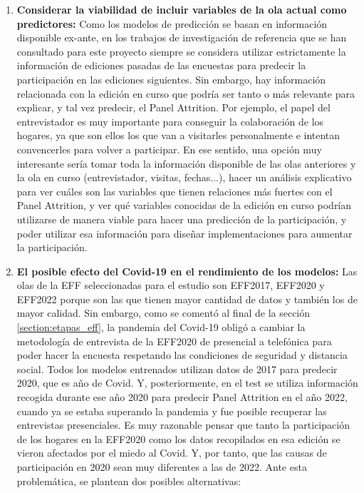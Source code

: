 \begin{enumerate}
    \item \textbf{Considerar la viabilidad de incluir variables de la ola actual como predictores:} Como los modelos de predicción se basan en información disponible ex-ante, en los trabajos de investigación de referencia que se han consultado para este proyecto siempre se considera utilizar estrictamente la información de ediciones pasadas de las encuestas para predecir la participación en las ediciones siguientes. Sin embargo, hay información relacionada con la edición en curso que podría ser tanto o más relevante para explicar, y tal vez predecir, el Panel Attrition. Por ejemplo, el papel del entrevistador es muy importante para conseguir la colaboración de los hogares, ya que son ellos los que van a visitarles personalmente e intentan convencerles para volver a participar. En ese sentido, una opción muy interesante sería tomar toda la información disponible de las olas anteriores y la ola en curso (entrevistador, visitas, fechas...), hacer un análisis explicativo para ver cuáles son las variables que tienen relaciones más fuertes con el Panel Attrition, y ver qué variables conocidas de la edición en curso podrían utilizarse de manera viable para hacer una predicción de la participación, y poder utilizar esa información para diseñar implementaciones para aumentar la participación.
    \item \textbf{El posible efecto del Covid-19 en el rendimiento de los modelos:} Las olas de la EFF seleccionadas para el estudio son EFF2017, EFF2020 y EFF2022 porque son las que tienen mayor cantidad de datos y también los de mayor calidad. Sin embargo, como se comentó al final de la sección \ref{section:etapas_eff}, la pandemia del Covid-19 obligó a cambiar la metodología de entrevista de la EFF2020 de presencial a telefónica para poder hacer la encuesta respetando las condiciones de seguridad y distancia social. Todos los modelos entrenados utilizan datos de 2017 para predecir 2020, que es año de Covid. Y, posteriormente, en el test se utiliza información recogida durante ese año 2020 para predecir Panel Attrition en el año 2022, cuando ya se estaba superando la pandemia y fue posible recuperar las entrevistas presenciales. Es muy razonable pensar que tanto la participación de los hogares en la EFF2020 como los datos recopilados en esa edición se vieron afectados por el miedo al Covid. Y, por tanto, que las causas de participación en 2020 sean muy diferentes a las de 2022. Ante esta problemática, se plantean dos posibles alternativas:
    \begin{enumerate}[noitemsep]

\end{enumerate}
\end{enumerate}
